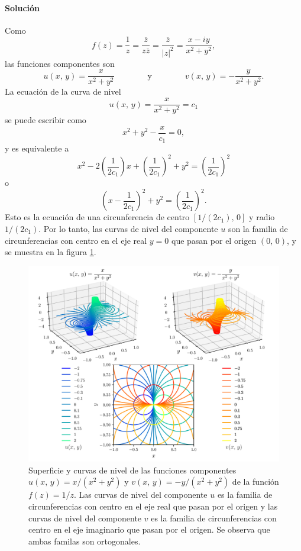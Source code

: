 \documentclass[a4paper]{report}
\begin{document}
\paragraph{Solución} Como
\[
 f(z)=\frac{1}{z}=\frac{\overline{z}}{z\overline{z}}=\frac{\overline{z}}{|z|^2}=\frac{x-iy}{x^2+y^2},
\]
las funciones componentes son
\[
 u(x,\,y)=\frac{x}{x^2+y^2}
 \qquad\qquad\textrm{y}\qquad\qquad
 v(x,\,y)=-\frac{y}{x^2+y^2}.
\]
La ecuación de la curva de nivel 
\[
 u(x,\,y)=\frac{x}{x^2+y^2}=c_1
\]
se puede escribir como
\[
 x^2+y^2-\frac{x}{c_1}=0,
\]
y es equivalente a
\[
 x^2-2\left(\frac{1}{2c_1}\right)x+\left(\frac{1}{2c_1}\right)^2+y^2=\left(\frac{1}{2c_1}\right)^2
\]
o
\[
 \left(x-\frac{1}{2c_1}\right)^2+y^2=\left(\frac{1}{2c_1}\right)^2.
\]
Esto es la ecuación de una circunferencia de centro \([1/(2c_1),\,0]\) y radio \(1/(2c_1)\). Por lo tanto, las curvas de nivel del componente \(u\) son la familia de circunferencias con centro en el eje real \(y=0\) que pasan por el origen \((0,\,0)\), y se muestra en la figura \ref{fig:exercise_27_4}.
\begin{figure}[!htb]
 \begin{center}
 \includegraphics[width=\textwidth]{figuras/exercise_27_4.pdf}
 \caption{\label{fig:exercise_27_4} Superficie y curvas de nivel de las funciones componentes \(u(x,\,y)=x/(x^2+y^2)\) y \(v(x,\,y)=-y/(x^2+y^2)\) de la función \(f(z)=1/z\). Las curvas de nivel del componente \(u\) es la familia de circunferencias con centro en el eje real que pasan por el origen y las curvas de nivel del componente \(v\) es la familia de circunferencias con centro en el eje imaginario que pasan por el origen. Se observa que ambas familas son ortogonales.}
 \end{center}
\end{figure}
\end{document}
